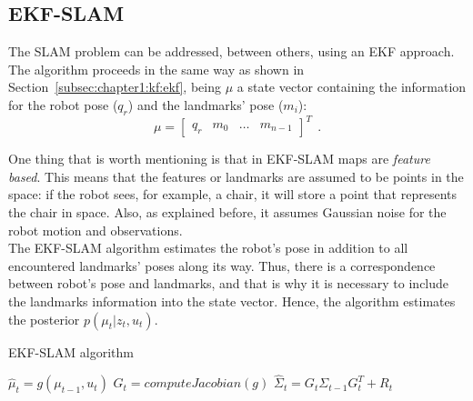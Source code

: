 \subsection{EKF-SLAM}
\label{subsec:chapter1:slam:ekfslam}
The \ac{SLAM} problem can be addressed, between others, using an \ac{EKF} approach. The algorithm proceeds in the same way as shown in Section~\ref{subsec:chapter1:kf:ekf}, being $\mu$ a state vector containing the information for the robot pose ($q_r$) and the landmarks' pose ($m_i$):
\begin{equation}
    \mu = \begin{bmatrix}
        q_r & m_0 & \dots & m_{n-1}
    \end{bmatrix}^T~~.
\end{equation}

One thing that is worth mentioning is that in EKF-SLAM maps are \emph{feature based}. This means that the features or landmarks are assumed to be points in the space: if the robot sees, for example, a chair, it will store a point that represents the chair in space. Also, as explained before, it assumes Gaussian noise for the robot motion and observations.\\

The EKF-SLAM algorithm estimates the robot's pose in addition to all encountered landmarks' poses along its way. Thus, there is a correspondence between robot's pose and landmarks, and that is why it is necessary to include the landmarks information into the state vector. Hence, the algorithm estimates the posterior $p\left(\mu_t | z_t, u_t\right)$.\\

\begin{algorithm}[h]
    \caption{EKF-SLAM algorithm}
    \label{alg:chapter1:slam:ekfslam}
    \BlankLine
    \BlankLine
    $\hat\mu_t = g\left(\mu_{t-1}, u_t\right)$\;
    $G_t = computeJacobian\left(g\right)$\;
    $\hat\Sigma_t = G_t \Sigma_{t-1} G_t^T + R_t$\;
    \BlankLine
    \BlankLine
\end{algorithm}

